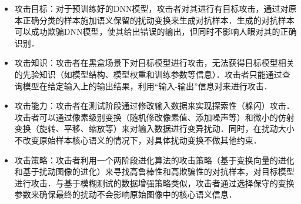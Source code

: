 \begin{itemize}
	\item 攻击目标：对于预训练好的DNN模型，攻击者对其进行有目标攻击，通过对原本正确分类的样本施加语义保留的扰动变换来生成对抗样本．生成的对抗样本可以成功欺骗DNN模型，使其给出错误的输出，但同时不影响人眼对其的正确识别．  
	\item 攻击知识：攻击者在黑盒场景下对目标模型进行攻击，无法获得目标模型相关的先验知识（如模型结构、模型权重和训练参数等信息）．攻击者只能通过查询模型在给定输入上的输出结果，利用“输入-输出”信息对来进行攻击．  
	\item 攻击能力：攻击者在测试阶段通过修改输入数据来实现探索性（躲闪）攻击．攻击者可以通过像素级别变换（随机修改像素值、添加噪声等）和微小的仿射变换（旋转、平移、缩放等）来对输入数据进行变异扰动．同时，在扰动大小不改变原始样本核心语义的情况下，对具体扰动变换不做其他约束．  
	\item 攻击策略：攻击者利用一个两阶段进化算法的攻击策略（基于变换向量的进化和基于扰动图像的进化）来寻找高鲁棒性和高欺骗性的对抗样本，对目标模型进行攻击．与基于模糊测试的数据增强策略类似，攻击者通过选择保守的变换参数来确保最终的扰动不会影响原始图像中的核心语义信息．  
\end{itemize}